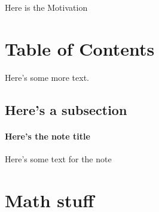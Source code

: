 \documentclass[12pt]{article}
\begin{document}
	\MakeScribeTop


Here is the Motivation

\section{Table of Contents}

Here's some more text.

\subsection{Here's a subsection}

\paragraph{Here's the note title} Here's some text for the note 



\section{Math stuff}

%


\end{document}
